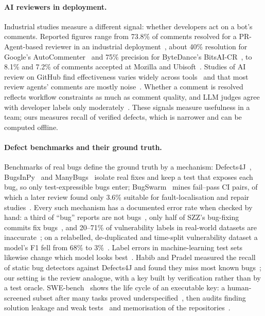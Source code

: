 \documentclass[11pt,a4paper]{article}
\begin{document}
\paragraph{AI reviewers in deployment.} Industrial studies measure a
different signal: whether developers act on a bot's comments. Reported figures
range from 73.8\% of comments resolved for a PR-Agent-based reviewer in an
industrial deployment~\cite{cihan2025}, about 40\% resolution for Google's
AutoCommenter~\cite{vijayvergiya2024autocommenter} and 75\% precision for
ByteDance's BitsAI-CR~\cite{sun2025bitsaicr}, to 8.1\% and 7.2\% of comments
accepted at Mozilla and Ubisoft~\cite{olewicki2024revmate}. Studies of AI
review on GitHub find effectiveness varies widely across
tools~\cite{sun2026aiactions} and that most review agents' comments are mostly
noise~\cite{chowdhury2026cra}. Whether a comment is resolved reflects workflow
constraints as much as comment quality, and LLM judges agree with developer
labels only moderately~\cite{karakaya2026}. These signals measure usefulness
in a team; ours measures recall of verified defects, which is narrower and
can be computed offline.

\paragraph{Defect benchmarks and their ground truth.} Benchmarks of real bugs
define the ground truth by a mechanism: Defects4J~\cite{defects4j},
BugsInPy~\cite{widyasari2020bugsinpy} and ManyBugs~\cite{legoues2015manybugs}
isolate real fixes and keep a test that exposes each bug, so only
test-expressible bugs enter; BugSwarm~\cite{tomassi2019bugswarm} mines fail--pass CI pairs, of which a
later review found only 3.6\% suitable for fault-localisation and repair
studies~\cite{durieux2019bugswarm}. Every such mechanism has a documented
error rate when checked by hand: a third of ``bug'' reports are not
bugs~\cite{herzig2013}, only half of SZZ's bug-fixing commits fix
bugs~\cite{herbold2022szz}, and 20--71\% of vulnerability labels in real-world
datasets are inaccurate~\cite{croft2023}; on a relabelled, de-duplicated and
time-split vulnerability dataset a model's F1 fell from 68\% to
3\%~\cite{ding2025primevul}. Label errors in
machine-learning test sets likewise change which model looks
best~\cite{northcutt2021}. Habib and Pradel measured the recall of static bug
detectors against Defects4J and found they miss most known
bugs~\cite{habib2018}; our setting is the review analogue, with a key built by
verification rather than by a test oracle. SWE-bench~\cite{swebench} shows
the life cycle of an executable key: a human-screened subset after many tasks
proved underspecified~\cite{swebenchverified}, then audits finding solution
leakage and weak tests~\cite{aleithan2024,wang2026solved,yu2025utboost} and
memorisation of the repositories~\cite{liang2026illusion}.
\end{document}
